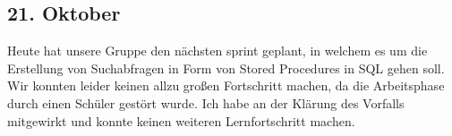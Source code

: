 \subsection{21. Oktober}
Heute hat unsere Gruppe den nächsten sprint geplant, in welchem es um die Erstellung von Suchabfragen in Form von Stored Procedures in SQL gehen soll. Wir konnten leider keinen allzu großen Fortschritt machen, da die Arbeitsphase durch einen Schüler gestört wurde. Ich habe an der Klärung des Vorfalls mitgewirkt und konnte keinen weiteren Lernfortschritt machen.
